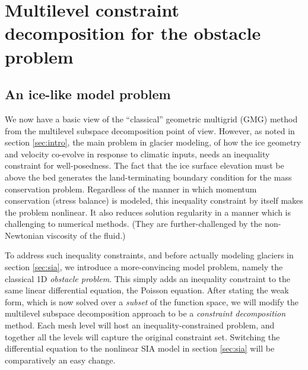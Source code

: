 \documentclass[letterpaper,final,12pt,reqno]{amsart}
\numberwithin{equation}{section}
\numberwithin{figure}{section}
\numberwithin{table}{section}
\begin{document}
\section{Multilevel constraint decomposition for the obstacle problem} \label{sec:obstacle}

\subsection*{An ice-like model problem}  We now have a basic view of the ``classical'' geometric multigrid (GMG) method from the multilevel subspace decomposition point of view.  However, as noted in section \ref{sec:intro}, the main problem in glacier modeling, of how the ice geometry and velocity co-evolve in response to climatic inputs, needs an inequality constraint for well-posedness.  The fact that the ice surface elevation must be above the bed generates the land-terminating boundary condition for the mass conservation problem.  Regardless of the manner in which momentum conservation (stress balance) is modeled, this inequality constraint by itself makes the problem nonlinear.  It also reduces solution regularity in a manner which is challenging to numerical methods.  (They are further-challenged by the non-Newtonian viscosity of the fluid.)

To address such inequality constraints, and before actually modeling glaciers in section \ref{sec:sia}, we introduce a more-convincing model problem, namely the classical 1D \emph{obstacle problem}.  This simply adds an inequality constraint to the same linear differential equation, the Poisson equation.  After stating the weak form, which is now solved over a \emph{subset} of the function space, we will modify the multilevel subspace decomposition approach to be a \emph{constraint decomposition} method.  Each mesh level will host an inequality-constrained problem, and together all the levels will capture the original constraint set.  Switching the differential equation to the nonlinear SIA model in section \ref{sec:sia} will be comparatively an easy change.
\end{document}
